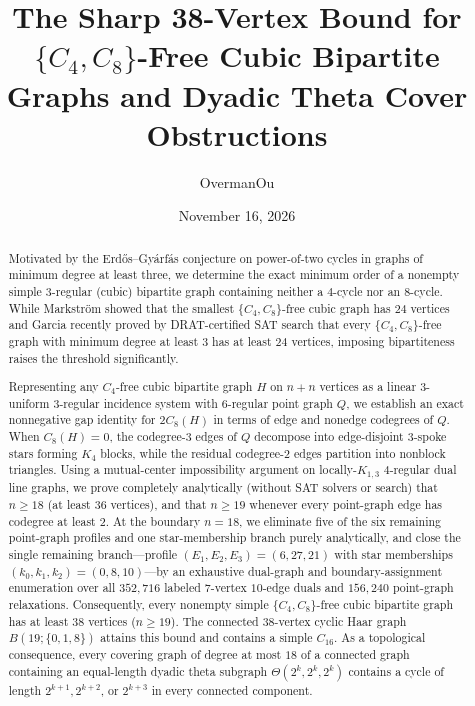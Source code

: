 \documentclass[11pt]{amsart}
\title[Sharp 38-Vertex Bound for $\{C_4,C_8\}$-Free Cubic Bipartite Graphs]{The Sharp 38-Vertex Bound for $\{C_4, C_8\}$-Free Cubic Bipartite Graphs and Dyadic Theta Cover Obstructions}
\author{OvermanOu}
\date{November 16, 2026}
\theoremstyle{definition}
\theoremstyle{remark}
\begin{document}
\begin{abstract}
Motivated by the Erd\H{o}s--Gy\'arf\'as conjecture on power-of-two cycles in graphs of minimum degree at least three, we determine the exact minimum order of a nonempty simple $3$-regular (cubic) bipartite graph containing neither a $4$-cycle nor an $8$-cycle. While Markstr\"om showed that the smallest $\{C_4, C_8\}$-free cubic graph has $24$ vertices and Garcia recently proved by DRAT-certified SAT search that every $\{C_4, C_8\}$-free graph with minimum degree at least $3$ has at least $24$ vertices, imposing bipartiteness raises the threshold significantly.

Representing any $C_4$-free cubic bipartite graph $H$ on $n + n$ vertices as a linear $3$-uniform $3$-regular incidence system with $6$-regular point graph $Q$, we establish an exact nonnegative gap identity for $2 C_8(H)$ in terms of edge and nonedge codegrees of $Q$. When $C_8(H) = 0$, the codegree-$3$ edges of $Q$ decompose into edge-disjoint $3$-spoke stars forming $K_4$ blocks, while the residual codegree-$2$ edges partition into nonblock triangles. Using a mutual-center impossibility argument on locally-$K_{1,3}$ $4$-regular dual line graphs, we prove completely analytically (without SAT solvers or search) that $n \ge 18$ (at least $36$ vertices), and that $n \ge 19$ whenever every point-graph edge has codegree at least $2$. At the boundary $n = 18$, we eliminate five of the six remaining point-graph profiles and one star-membership branch purely analytically, and close the single remaining branch---profile $(E_1,E_2,E_3)=(6,27,21)$ with star memberships $(k_0,k_1,k_2)=(0,8,10)$---by an exhaustive dual-graph and boundary-assignment enumeration over all $352{,}716$ labeled $7$-vertex $10$-edge duals and $156{,}240$ point-graph relaxations. Consequently, every nonempty simple $\{C_4, C_8\}$-free cubic bipartite graph has at least $38$ vertices ($n \ge 19$). The connected $38$-vertex cyclic Haar graph $B(19; \{0,1,8\})$ attains this bound and contains a simple $C_{16}$. As a topological consequence, every covering graph of degree at most $18$ of a connected graph containing an equal-length dyadic theta subgraph $\Theta(2^k,2^k,2^k)$ contains a cycle of length $2^{k+1}, 2^{k+2}$, or $2^{k+3}$ in every connected component.
\end{abstract}

\maketitle
\end{document}
